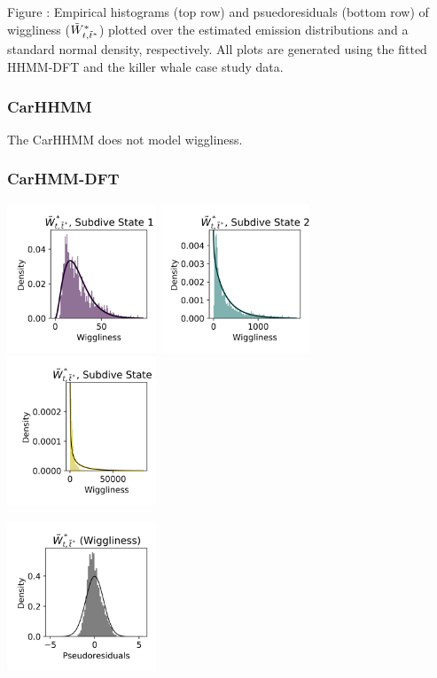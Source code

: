 \documentclass{article}
\begin{document}
        \noindent Figure : Empirical histograms (top row) and psuedoresiduals (bottom row) of wiggliness ($\tilde{W}^*_{t,\tilde t^*}$) plotted over the estimated emission distributions and a standard normal density, respectively. All plots are generated using the fitted HHMM-DFT and the killer whale case study data.
        \addtocounter{fignum}{1}
        
        \subsubsection{CarHHMM}
        
        The CarHHMM does not model wiggliness.
        
        \subsubsection{CarHMM-DFT}
        
        \begin{center}
        \includegraphics[width=1.75in]{../Plots/CarHMM_empirical_hist_ahat_0.png}
        \includegraphics[width=1.75in]{../Plots/CarHMM_empirical_hist_ahat_1.png}
        \includegraphics[width=1.75in]{../Plots/CarHMM_empirical_hist_ahat_2.png}
        
        \includegraphics[width=1.75in]{../Plots/CarHMM_psedoresids_ahat.png}
        \end{center}
        
\end{document}
